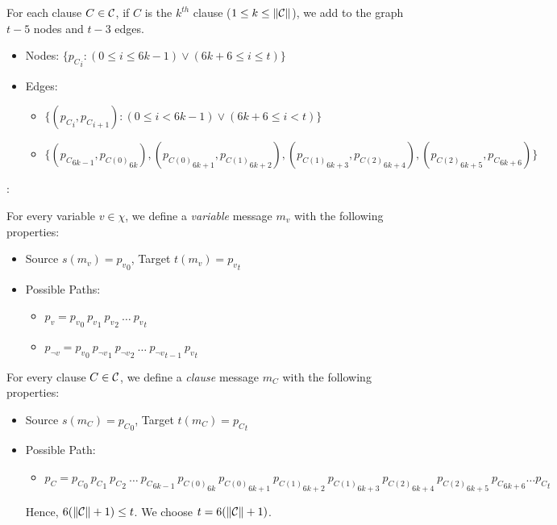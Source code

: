 \documentclass[11pt,eepic]{article}
\newcommand{\set}[1]{\{ #1  \}}
\newcommand{\C}{{\cal C}}
\begin{document}
		For each clause $C \in \C$, if $C$ is the $k^{th}$ clause ($1 \leq k \leq \Vert\C\Vert$), we add to the graph $t-5$ nodes and $t-3$ edges.
		\begin{itemize}
		\item Nodes:  $\set{{p_C}_i : (0 \leq i \leq 6k-1) \lor (6k+6 \leq i \leq t)}$
		\item Edges:
			\begin{itemize}
			\item $\set{({p_C}_i,{p_C}_{i+1}) : (0 \leq i < 6k-1) \lor (6k+6 \leq i < t)}$
			\item $\set{({p_C}_{6k-1},{p_{C(0)}}_{6k}), ({p_{C(0)}}_{6k+1},{p_{C(1)}}_{6k+2}), ({p_{C(1)}}_{6k+3},{p_{C(2)}}_{6k+4}), ({p_{C(2)}}_{6k+5},{p_C}_{6k+6})}$
			\end{itemize}
		\end{itemize}

		:

		For every variable $v \in \chi$, we define a {\em variable} message $m_v$ with the following properties:
		\begin{itemize}
		\item Source $s(m_v) = {p_v}_0$, Target $t(m_v) = {p_v}_t$
		\item Possible Paths:
			\begin{itemize}
			\item $p_v = {p_v}_0 \ {p_v}_1 \ {p_v}_2 \ \ldots \ {p_v}_t$
			\item ${p_{\neg v} = p_v}_0 \ {p_{\neg v}}_1 \ {p_{\neg v}}_2 \ \ldots \ {p_{\neg v}}_{t-1} \ {p_v}_t$
			\end{itemize}
		\end{itemize}

		For every clause $C \in \C$, we define a {\em clause} message $m_C$ with the following properties:
		\begin{itemize}
		\item Source $s(m_C) = {p_C}_0$, Target $t(m_C) = {p_C}_t$
		\item Possible Path:
			\begin{itemize}
			\item $p_C = {p_C}_0 \ {p_C}_1 \ {p_C}_2 \ \ldots \ {p_C}_{6k-1} \ {p_{C(0)}}_{6k} \ {p_{C(0)}}_{6k+1} \ {p_{C(1)}}_{6k+2} \ {p_{C(1)}}_{6k+3} \ {p_{C(2)}}_{6k+4} \ {p_{C(2)}}_{6k+5} \ {p_C}_{6k+6} \ldots {p_C}_t$
			\end{itemize}
			Hence, $6(\Vert\C\Vert+1)\leq t$. We choose $t = 6(\Vert\C\Vert+1)$.
		\end{itemize}
\end{document}
